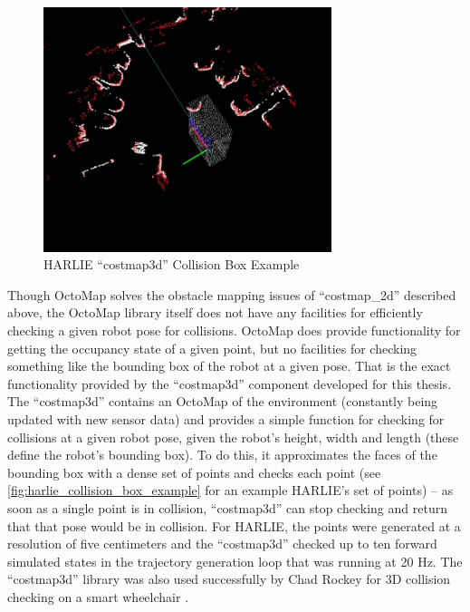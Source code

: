 \begin{figure}
\centering
\includegraphics[width=0.75\textwidth]{images/harlie_collision_box}
\caption{HARLIE ``costmap3d'' Collision Box Example \label{fig:harlie_collision_box_example}}
\end{figure}

Though OctoMap solves the obstacle mapping issues of ``costmap\_2d'' described above, the OctoMap library itself does not have any facilities for efficiently checking a given robot pose for collisions. OctoMap does provide functionality for getting the occupancy state of a given point, but no facilities for checking something like the bounding box of the robot at a given pose. That is the exact functionality provided by the ``costmap3d'' component developed for this thesis. The ``costmap3d'' contains an OctoMap of the environment (constantly being updated with new sensor data) and provides a simple function for checking for collisions at a given robot pose, given the robot's height, width and length (these define the robot's bounding box). To do this, it approximates the faces of the bounding box with a dense set of points and checks each point (see \autoref{fig:harlie_collision_box_example} for an example HARLIE's set of points) -- as soon as a single point is in collision, ``costmap3d'' can stop checking and return that that pose would be in collision. For HARLIE, the points were generated at a resolution of five centimeters and the ``costmap3d'' checked up to ten forward simulated states in the trajectory generation loop that was running at 20 Hz. The ``costmap3d'' library was also used successfully by Chad Rockey for 3D collision checking on a smart wheelchair \autocite{Rockey2012}.

